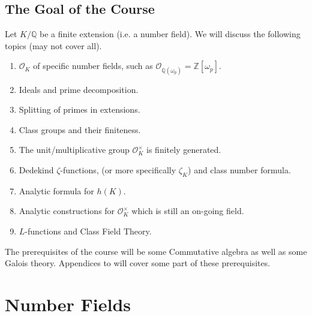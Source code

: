 \documentclass[10pt]{article}
\newcommand{\Z}[0]{\mathbb{Z}}
\newcommand{\Q}[0]{\mathbb{Q}}
\newcommand{\Ouv}[0]{\mathcal{O}}
\begin{document}
\subsection{The Goal of the Course}
Let $K/\Q$ be a finite extension (i.e. a number field). We will discuss the following topics (may not cover all).
\begin{enumerate}[1).]
    \item $\Ouv_K$ of specific number fields, such as $\Ouv_{\Q(\omega_p)}=\Z[\omega_p]$.
    \item Ideals and prime decomposition.
    \item Splitting of primes in extensions.
    \item Class groups and their finiteness.
    \item The unit/multiplicative group $\Ouv_K^\times$ is finitely generated.
    \item Dedekind $\zeta$-functions, (or more specifically $\zeta_K$) and class number formula.
    \item Analytic formula for $h(K)$.
    \item Analytic constructions for $\Ouv_K^\times$ which is still an on-going field.
    \item $L$-functions and Class Field Theory.
\end{enumerate}
The prerequisites of the course will be some Commutative algebra as well as some Galois theory. Appendices to \cite{Markus} will cover some part of these prerequisites.
\section{Number Fields}
\end{document}
